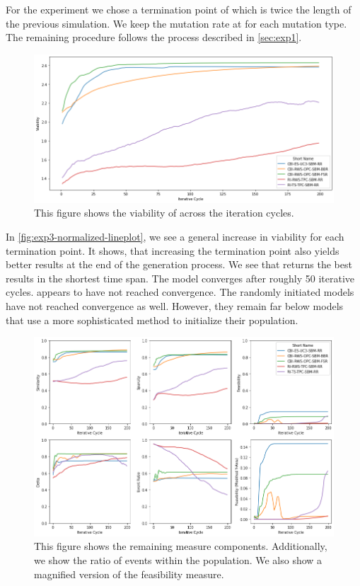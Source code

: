 \documentclass[./../../paper.tex]{subfiles}
\begin{document}
For the experiment we chose a termination point of  which is twice the length of the previous simulation. We keep the mutation rate at  for each mutation type. The remaining procedure follows the process described in \autoref{sec:exp1}.

\begin{figure}[htbp]
    \centering
    \includegraphics[width=\textwidth]{figures/generated/exp3_relative_cycles.png}
    \caption{This figure shows the viability of across the iteration cycles.}
    \label{fig:exp3-normalized-lineplot}
\end{figure}

In \autoref{fig:exp3-normalized-lineplot}, we see a general increase in viability for each termination point. It shows, that increasing the termination point also yields better results at the end of the generation process. 
We see that  returns the best results in the shortest time span. The model converges after roughly 50 iterative cycles.  appears to have not reached convergence. 
The randomly initiated models have not reached convergence as well. However, they remain far below models that use a more sophisticated method to initialize their population. 

\begin{figure}[htbp]
    \centering
    \includegraphics[width=\textwidth]{figures/generated/exp3_cycles_components.png}
    \caption{This figure shows the remaining measure components. Additionally, we show the ratio of events within the population. We also show a magnified version of the feasibility measure.}
    \label{fig:exp3-components}
\end{figure}
\end{document}
